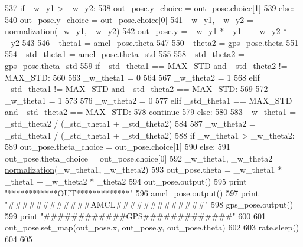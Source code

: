 \begin{DoxyCode}
537         \textcolor{keywordflow}{if} \_w\_y1 > \_w\_y2:
538             out\_pose.y\_choice = out\_pose.choice[1]
539         \textcolor{keywordflow}{else}:
540             out\_pose.y\_choice = out\_pose.choice[0]
541         \_w\_y1, \_w\_y2 = \hyperlink{namespacefuse___g___a__dox_ab338e80a4f259a8d14b03d63b4c19d3b}{normalization}(\_w\_y1, \_w\_y2)
542         out\_pose.y = \_w\_y1 * \_y1 + \_w\_y2 * \_y2
543         
546         \_theta1 = amcl\_pose.theta
547         
550         \_theta2 = gps\_pose.theta
551         
554         \_std\_theta1 = amcl\_pose.theta\_std
555         
558         \_std\_theta2 = gps\_pose.theta\_std
559         \textcolor{keywordflow}{if} \_std\_theta1 == MAX\_STD \textcolor{keywordflow}{and} \_std\_theta2 != MAX\_STD:
560             
563             \_w\_theta1 = 0
564             
567             \_w\_theta2 = 1
568         \textcolor{keywordflow}{elif} \_std\_theta1 != MAX\_STD \textcolor{keywordflow}{and} \_std\_theta2 == MAX\_STD:
569             
572             \_w\_theta1 = 1
573             
576             \_w\_theta2 = 0
577         \textcolor{keywordflow}{elif} \_std\_theta1 == MAX\_STD \textcolor{keywordflow}{and} \_std\_theta2 == MAX\_STD:
578             \textcolor{keywordflow}{continue}
579         \textcolor{keywordflow}{else}:
580             
583             \_w\_theta1 = \_std\_theta2 / (\_std\_theta1 + \_std\_theta2)
584             
587             \_w\_theta2 = \_std\_theta1 / (\_std\_theta1 + \_std\_theta2)
588         \textcolor{keywordflow}{if} \_w\_theta1 > \_w\_theta2:
589             out\_pose.theta\_choice = out\_pose.choice[1]
590         \textcolor{keywordflow}{else}:
591             out\_pose.theta\_choice = out\_pose.choice[0]
592         \_w\_theta1, \_w\_theta2 = \hyperlink{namespacefuse___g___a__dox_ab338e80a4f259a8d14b03d63b4c19d3b}{normalization}(\_w\_theta1, \_w\_theta2)
593         out\_pose.theta = \_w\_theta1 * \_theta1 + \_w\_theta2 * \_theta2
594         out\_pose.output()
595         \textcolor{keywordflow}{print} \textcolor{stringliteral}{"************OUT*************"}
596         amcl\_pose.output()
597         \textcolor{keywordflow}{print} \textcolor{stringliteral}{"############AMCL#############"}
598         gps\_pose.output()
599         \textcolor{keywordflow}{print} \textcolor{stringliteral}{"############GPS#############"}
600 
601         out\_pose.set\_map(out\_pose.x, out\_pose.y, out\_pose.theta)
602 
603         rate.sleep()
604 
605 
\end{DoxyCode}
\mbox{\label{namespacefuse___g___a__dox_a74ca52501813c654c46db737d87fd009}} 
